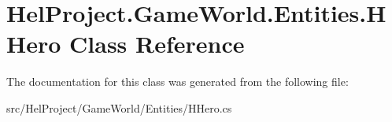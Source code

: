 \hypertarget{class_hel_project_1_1_game_world_1_1_entities_1_1_h_hero}{}\section{Hel\+Project.\+Game\+World.\+Entities.\+H\+Hero Class Reference}
\label{class_hel_project_1_1_game_world_1_1_entities_1_1_h_hero}


The documentation for this class was generated from the following file\+:\begin{DoxyCompactItemize}
\item 
src/\+Hel\+Project/\+Game\+World/\+Entities/H\+Hero.\+cs\end{DoxyCompactItemize}

